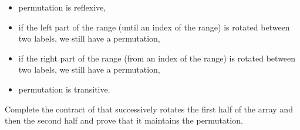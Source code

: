 \begin{itemize}
\item permutation is reflexive,
\item if the left part of the range (until an index of the range) is rotated
  between two labels, we still have a permutation,
\item if the right part of the range (from an index of the range) is rotated
  between two labels, we still have a permutation,
\item permutation is transitive.
\end{itemize}




Complete the contract of  that successively rotates the
first half of the array and then the second half and prove that it maintains the
permutation.


